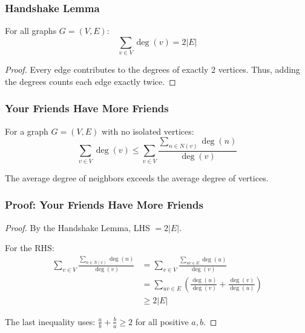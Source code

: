 \documentclass{beamer}
\begin{document}
\begin{frame}
  \frametitle{Handshake Lemma}
  
  \begin{lemma}
    For all graphs $G = (V, E)$:
    $$\sum_{v \in V} \deg(v) = 2|E|$$
  \end{lemma}
  
  \begin{proof}
    Every edge contributes to the degrees of exactly 2 vertices. Thus, adding the degrees counts each edge exactly twice.
  \end{proof}
\end{frame}

\begin{frame}
  \frametitle{Your Friends Have More Friends}
  
  \begin{theorem}
    For a graph $G = (V, E)$ with no isolated vertices:
    $$\sum_{v \in V} \deg(v) \leq \sum_{v \in V} \frac{\sum_{n \in N(v)} \deg(n)}{\deg(v)}$$
    
    The average degree of neighbors exceeds the average degree of vertices.
  \end{theorem}
\end{frame}

\begin{frame}
  \frametitle{Proof: Your Friends Have More Friends}
  
  \begin{proof}
    By the Handshake Lemma, LHS $= 2|E|$.
    
    For the RHS:
    \begin{align*}
      \sum_{v \in V} \frac{\sum_{n \in N(v)} \deg(n)}{\deg(v)} &= \sum_{v \in V} \frac{\sum_{uv \in E} \deg(u)}{\deg(v)} \\
      &= \sum_{uv \in E} \left(\frac{\deg(u)}{\deg(v)} + \frac{\deg(v)}{\deg(u)}\right) \\
      &\geq 2|E|
    \end{align*}
    
    The last inequality uses: $\frac{a}{b} + \frac{b}{a} \geq 2$ for all positive $a, b$.
  \end{proof}
\end{frame}
\end{document}
